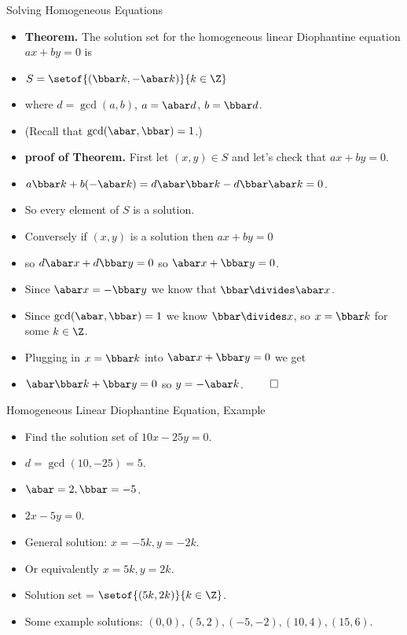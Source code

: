 \documentclass[handout]{beamer}
\begin{document}
\begin{frame}{Solving Homogeneous Equations}

\begin{itemize}
  \item \textbf{Theorem.} The solution set for the homogeneous linear Diophantine equation
  $ax + by =0$ is
  \item $S = \setof{(\bbar k, -\abar k)}{k\in \Z}$
  \item where $d=\gcd(a,b)$, $a=\abar d$, $b = \bbar d$.
  \item (Recall that $\gcd(\abar,\bbar)=1$.)
  \item \textbf{proof of Theorem.} First let $(x,y)\in S$ and let's check that $ax+by=0$.
  \item $a \bbar k + b(-\abar k) = d\abar\bbar k  - d\bbar\abar k = 0$.
  \item So every element of $S$ is a solution.
  \item Conversely if $(x,y)$ is a solution then $ax+by=0$
  \item so $d\abar x + d \bbar y = 0$ so $\abar x + \bbar y = 0$.
  \item Since $\abar x = -\bbar y$ we know that $\bbar \divides \abar x$.
  \item Since $\gcd(\abar,\bbar) = 1$ we know  $\bbar\divides x$, so $x=\bbar k$ for some $k\in\Z$.
  \item Plugging in $x=\bbar k$ into $\abar x + \bbar y = 0$ we get
  \item $\abar \bbar k + \bbar y = 0$ so $y=-\abar k$. $\qed$
\end{itemize}

\end{frame}


\begin{frame}{Homogeneous Linear Diophantine Equation, Example}

\begin{itemize}
  \item Find the solution set of $10x - 25y = 0$.
  \item $d = \gcd(10, -25) = 5$.
  \item $\abar = 2, \bbar = -5$.
  \item $2x - 5y = 0$.
  \item General solution: $x=-5k, y=-2k$.
  \item Or equivalently $x=5k, y=2k$.
  \item Solution set = $\setof{(5k, 2k)}{k\in\Z}$.
  \item Some example solutions: $(0,0), (5,2),(-5,-2), (10,4), (15, 6)$.
\end{itemize}

\end{frame}
\end{document}
